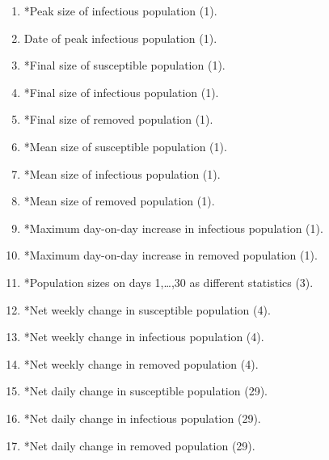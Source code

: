 \documentclass[11pt,a4paper]{article}
\theoremstyle{break}
\begin{document}
  \begin{table}[H]
    \centering
    \begin{framed}
      {\small
        \begin{multicols}{2}
          \begin{enumerate}[label=(S\arabic*)]
            \item *Peak size of infectious population (1).\label{table_list_of_summary_statistics_peak_size}
            \item Date of peak infectious population (1).\label{table_list_of_summary_statistics_peak_date}
            \item *Final size of susceptible population (1).\label{table_list_of_summary_statistics_final_sus}
            \item *Final size of infectious population (1).\label{table_list_of_summary_statistics_final_inf}
            \item *Final size of removed population (1).\label{table_list_of_summary_statistics_final_rem}
            \item *Mean size of susceptible population (1).\label{table_list_of_summary_statistics_mean_sus}
            \item *Mean size of infectious population (1).\label{table_list_of_summary_statistics_mean_inf}
            \item *Mean size of removed population (1).\label{table_list_of_summary_statistics_mean_rem}
            \item *Maximum day-on-day increase in infectious population (1).
            \item *Maximum day-on-day increase in removed population (1).
            \item *Population sizes on days 1,\dots,30 as different statistics (3).\label{table_list_of_summary_statistics_daily}
            \item *Net weekly change in susceptible population (4).\label{table_list_of_summary_statistics_weekly_sus}
            \item *Net weekly change in infectious population (4).\label{table_list_of_summary_statistics_weekly_inf}
            \item *Net weekly change in removed population (4).\label{table_list_of_summary_statistics_weekly_rem}
            \item *Net daily change in susceptible population (29).
            \item *Net daily change in infectious population (29).
            \item *Net daily change in removed population (29).\label{table_list_of_summary_statistics_daily_change_removed}

\end{enumerate}
\end{multicols}}
\end{framed}
\end{table}
\end{document}
